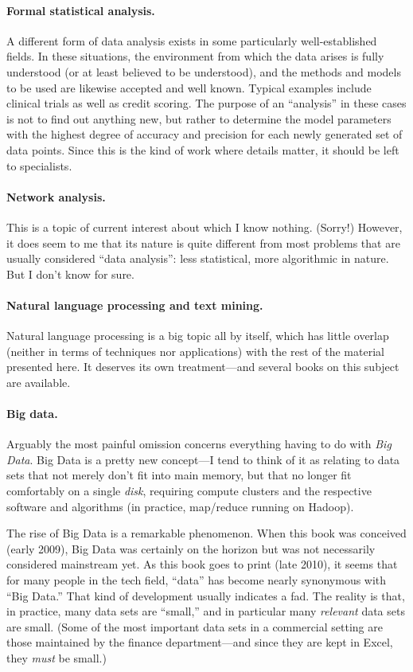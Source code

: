 \paragraph{Formal statistical analysis.} A different form of data analysis
exists in some particularly well-established fields. In these
situations, the environment from which the data arises is fully
understood (or at least believed to be understood), and the methods
and models to be used are likewise accepted and well known. Typical
examples include clinical trials as well as credit scoring. The
purpose of an ``analysis'' in these cases is not to find out
anything new, but rather to determine the model parameters with the
highest degree of accuracy and precision for each newly generated
set of data points.  Since this is the kind of work where details
matter, it should be left to specialists.

\paragraph{Network analysis.} This is a topic of current interest about
which I know nothing. (Sorry!)  However, it does seem to me that its
nature is quite different from most problems that are usually
considered ``data analysis'': less statistical, more algorithmic in
nature. But I don't know for sure.

\paragraph{Natural language processing and text mining.} Natural language
processing is a big topic all by itself, which has little overlap
(neither in terms of techniques nor applications) with the rest of
the material presented here. It deserves its own treatment---and
several books on this subject  are available.

\paragraph{Big data.} Arguably the most painful omission concerns
everything having to do with \emph{Big Data}. Big Data is a pretty
new concept---I tend to think of it as relating to data sets that
not merely don't fit into main memory, but that no longer fit
comfortably on a single \emph{disk}, requiring compute clusters and
the respective software and algorithms (in practice, map/reduce
running on Hadoop).

The rise of Big Data is a remarkable phenomenon. When this book was
conceived (early 2009), Big Data was certainly on the horizon but
was not necessarily considered mainstream yet.  As this book goes to
print (late 2010), it seems that for many people in the tech field,
``data'' has become nearly synonymous with ``Big Data.''  That kind
of development usually indicates a fad. The reality is that, in
practice, many data sets are ``small,'' and in particular many
\emph{relevant} data sets are small.  (Some of the most important
data sets in a commercial setting are those maintained by the
finance department---and since they are kept in Excel, they
\emph{must} be small.)

